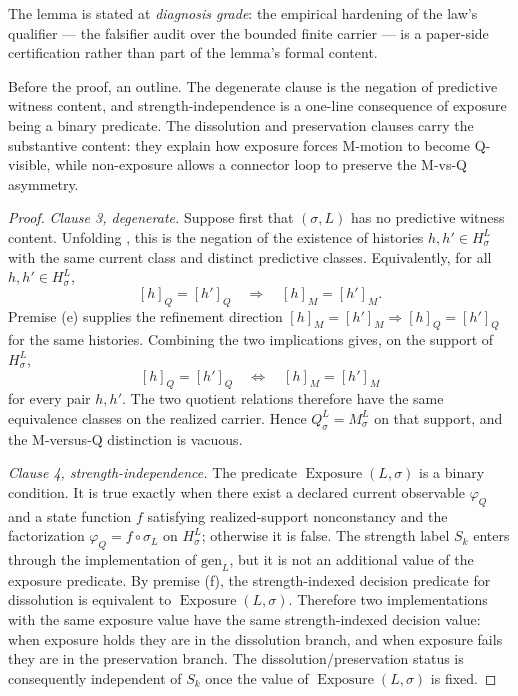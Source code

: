 \documentclass[11pt]{article}
\newcommand{\Substrate}{\sigma}             \newcommand{\Lift}{L}                       \newcommand{\LiftState}{\sigma_{L}}         \newcommand{\HistorySpace}{H_{\Substrate}^{\Lift}}
\newcommand{\Qquotient}{Q_{\Substrate}^{\Lift}}
\newcommand{\Mquotient}{M_{\Substrate}^{\Lift}}
\newcommand{\Qclass}[1]{[#1]_{Q}}
\newcommand{\Mclass}[1]{[#1]_{M}}
\newcommand{\CurrentObservable}{\varphi_{Q}}    \newcommand{\Exposure}{\operatorname{Exposure}}
\newcommand{\StrengthClass}[1]{S_{#1}}
\newcommand{\DiagnosisGrade}{\emph{diagnosis grade}}
\theoremstyle{definition}
\begin{document}
The lemma is stated at \DiagnosisGrade{}: the empirical hardening of
the law's qualifier --- the falsifier audit over the bounded finite
carrier --- is a paper-side certification rather than part of the
lemma's formal content.

Before the proof, an outline.  The degenerate clause is the negation of
predictive witness content, and strength-independence is a one-line
consequence of exposure being a binary predicate.  The dissolution and
preservation clauses carry the substantive content: they explain how
exposure forces M-motion to become Q-visible, while non-exposure allows
a connector loop to preserve the M-vs-Q asymmetry.

\begin{proof}
\emph{Clause 3, degenerate.}  Suppose first that
\((\Substrate,\Lift)\) has no predictive witness content.  Unfolding
, this is the negation of the
existence of histories \(h,h'\in\HistorySpace\) with the same current
class and distinct predictive classes.  Equivalently, for all
\(h,h'\in\HistorySpace\),
\[
  \Qclass{h}=\Qclass{h'}
  \quad\Longrightarrow\quad
  \Mclass{h}=\Mclass{h'} .
\]
Premise (e) supplies the refinement direction
\(\Mclass{h}=\Mclass{h'}\Rightarrow\Qclass{h}=\Qclass{h'}\) for the
same histories.  Combining the two implications gives, on the support
of \(\HistorySpace\),
\[
  \Qclass{h}=\Qclass{h'}
  \quad\Longleftrightarrow\quad
  \Mclass{h}=\Mclass{h'}
\]
for every pair \(h,h'\).  The two quotient relations therefore have
the same equivalence classes on the realized carrier.  Hence
\(\Qquotient=\Mquotient\) on that support, and the M-versus-Q
distinction is vacuous.

\emph{Clause 4, strength-independence.}  The predicate
\(\Exposure(\Lift,\Substrate)\) is a binary condition.  It is true
exactly when there exist a declared current observable
\(\CurrentObservable\) and a state function \(f\) satisfying
realized-support nonconstancy and the factorization
\(\CurrentObservable=f\circ\LiftState\) on \(\HistorySpace\); otherwise
it is false.  The strength label \(\StrengthClass{k}\) enters through
the implementation of \(\mathrm{gen}_{\Lift}\), but it is not an
additional value of the exposure predicate.  By premise (f), the
strength-indexed decision predicate for dissolution is equivalent to
\(\Exposure(\Lift,\Substrate)\).  Therefore two implementations with
the same exposure value have the same strength-indexed decision value:
when exposure holds they are in the dissolution branch, and when
exposure fails they are in the preservation branch.  The
dissolution/preservation status is consequently independent of
\(\StrengthClass{k}\) once the value of
\(\Exposure(\Lift,\Substrate)\) is fixed.


\end{proof}
\end{document}
